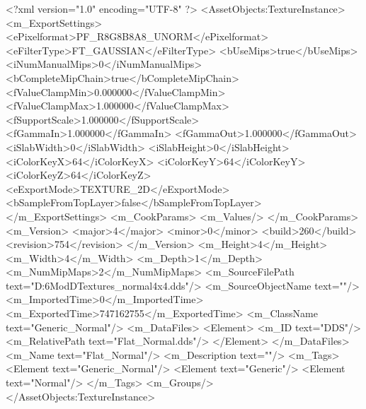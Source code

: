 <?xml version="1.0" encoding="UTF-8" ?>
<AssetObjects:TextureInstance>
	<m_ExportSettings>
		<ePixelformat>PF_R8G8B8A8_UNORM</ePixelformat>
		<eFilterType>FT_GAUSSIAN</eFilterType>
		<bUseMips>true</bUseMips>
		<iNumManualMips>0</iNumManualMips>
		<bCompleteMipChain>true</bCompleteMipChain>
		<fValueClampMin>0.000000</fValueClampMin>
		<fValueClampMax>1.000000</fValueClampMax>
		<fSupportScale>1.000000</fSupportScale>
		<fGammaIn>1.000000</fGammaIn>
		<fGammaOut>1.000000</fGammaOut>
		<iSlabWidth>0</iSlabWidth>
		<iSlabHeight>0</iSlabHeight>
		<iColorKeyX>64</iColorKeyX>
		<iColorKeyY>64</iColorKeyY>
		<iColorKeyZ>64</iColorKeyZ>
		<eExportMode>TEXTURE_2D</eExportMode>
		<bSampleFromTopLayer>false</bSampleFromTopLayer>
	</m_ExportSettings>
	<m_CookParams>
		<m_Values/>
	</m_CookParams>
	<m_Version>
		<major>4</major>
		<minor>0</minor>
		<build>260</build>
		<revision>754</revision>
	</m_Version>
	<m_Height>4</m_Height>
	<m_Width>4</m_Width>
	<m_Depth>1</m_Depth>
	<m_NumMipMaps>2</m_NumMipMaps>
	<m_SourceFilePath text="D:\Civ6Mod\3D\Util Textures\flat_normal4x4.dds"/>
	<m_SourceObjectName text=""/>
	<m_ImportedTime>0</m_ImportedTime>
	<m_ExportedTime>747162755</m_ExportedTime>
	<m_ClassName text="Generic_Normal"/>
	<m_DataFiles>
		<Element>
			<m_ID text="DDS"/>
			<m_RelativePath text="Flat_Normal.dds"/>
		</Element>
	</m_DataFiles>
	<m_Name text="Flat_Normal"/>
	<m_Description text=""/>
	<m_Tags>
		<Element text="Generic_Normal"/>
		<Element text="Generic"/>
		<Element text="Normal"/>
	</m_Tags>
	<m_Groups/>
</AssetObjects:TextureInstance>

 